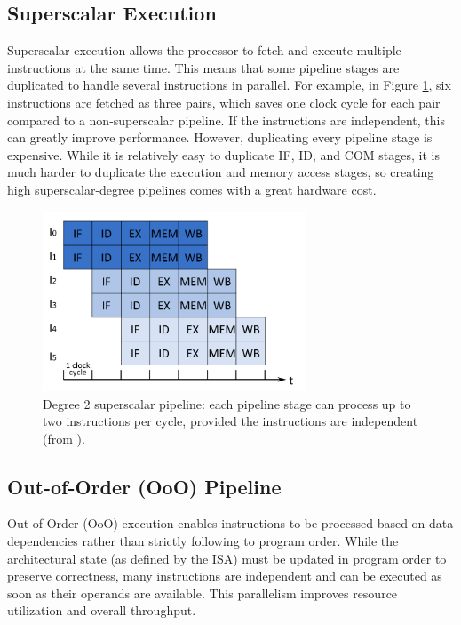 \subsection{Superscalar Execution}

Superscalar execution allows the processor to fetch and execute multiple instructions at the same time. This means that some pipeline stages are duplicated to handle several instructions in parallel. For example, in Figure \ref{fig:superscalar}, six instructions are fetched as three pairs, which saves one clock cycle for each pair compared to a non-superscalar pipeline. If the instructions are independent, this can greatly improve performance. However, duplicating every pipeline stage is expensive. While it is relatively easy to duplicate IF, ID, and COM stages, it is much harder to duplicate the execution and memory access stages, so creating high superscalar-degree pipelines comes with a great hardware cost.

\begin{figure}[H]
    \centering
    \includegraphics[width=0.7\textwidth]{figures/multiscalar-execution.png}
    \caption{Degree 2 superscalar pipeline: each pipeline stage can process up to two instructions per cycle, provided the instructions are independent (from \cite{perais_increasing_2016}).}
    \label{fig:superscalar}
\end{figure}

\subsection{Out-of-Order (OoO) Pipeline}
Out-of-Order (OoO) execution enables instructions to be processed based on data dependencies rather than strictly following to program order. While the architectural state (as defined by the ISA) must be updated in program order to preserve correctness, many instructions are independent and can be executed as soon as their operands are available. This parallelism improves resource utilization and overall throughput.

